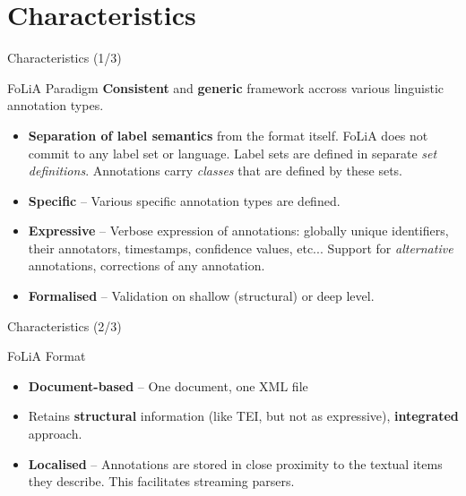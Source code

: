 \documentclass[xcolor=table,10pt,t]{beamer}
\begin{document}
\section{Characteristics}

\begin{frame}{Characteristics (1/3)}
    \begin{block}{FoLiA Paradigm}
        \textbf{Consistent} and \textbf{generic} framework accross various linguistic annotation types.
        \begin{itemize}
            \item \textbf{Separation of label semantics} from the format itself. FoLiA does not
                commit to any label set or language. Label sets are defined in
                separate \emph{set definitions}. Annotations carry
                \emph{classes} that are defined by these sets.
            \item \textbf{Specific} -- Various specific annotation types are defined.
            \item \textbf{Expressive} -- Verbose expression of annotations:
                globally unique identifiers, their annotators, timestamps, confidence values, etc... Support for
                \emph{alternative} annotations, corrections of any annotation.
            \item \textbf{Formalised} -- Validation on shallow (structural) or
                deep level. 
        \end{itemize}
    \end{block}
\end{frame}

\begin{frame}{Characteristics (2/3)}
    \begin{block}{FoLiA Format}
        \begin{itemize}
            \item \textbf{Document-based} -- One document, one XML file
            \item Retains \textbf{structural} information (like TEI, but not as expressive), \textbf{integrated} approach.
            \item \textbf{Localised} -- Annotations are stored in close proximity to the textual items they describe. This facilitates streaming parsers.
        \end{itemize}
    \end{block}
\end{frame}
\end{document}
